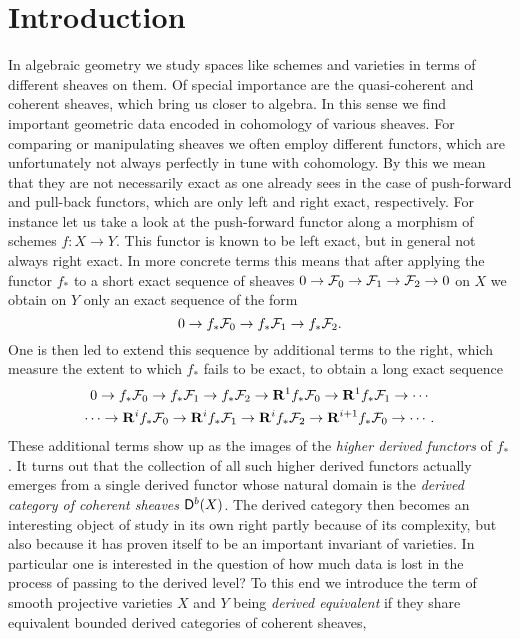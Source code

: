 \section*{Introduction}
{} %

In algebraic geometry we study spaces like schemes and varieties in terms of different sheaves on them. Of special importance are the quasi-coherent and coherent sheaves, which bring us closer to algebra. In this sense we find important geometric data encoded in cohomology of various sheaves. For comparing or manipulating sheaves we often employ different functors, which are unfortunately not always perfectly in tune with cohomology. By this we mean that they are not necessarily exact as one already sees in the case of push-forward and pull-back functors, which are only left and right exact, respectively.
For instance let us take a look at the push-forward functor along a morphism of schemes $f \colon X \to Y$. This functor is known to be left exact, but in general not always right exact. In more concrete terms this means that after applying the functor $f_*$ to a short exact sequence of sheaves $0 \to \mathcal F_0 \to \mathcal F_1 \to \mathcal F_2 \to 0$ on $X$ we obtain on $Y$ only an exact sequence of the form
\[
    0 \to f_*\mathcal F_0 \to f_*\mathcal F_1 \to f_*\mathcal F_2.
\]
One is then led to extend this sequence by additional terms to the right, which measure the extent to which $f_*$ fails to be exact, to obtain a long exact sequence
\begin{multline*}
    0 \to f_*\mathcal F_0 \to f_*\mathcal F_1 \to f_*\mathcal F_2 \to \mathbf{R}^{1}f_*\mathcal F_0 \to \mathbf{R}^{1}f_*\mathcal F_1 \to \cdots \\
    \cdots \to \mathbf{R}^{i}f_*\mathcal F_0 \to \mathbf{R}^{i}f_*\mathcal F_1 \to \mathbf{R}^{i}f_*\mathcal F_2 \to \mathbf{R}^{i+1}f_*\mathcal F_0 \to \cdots.
\end{multline*}
These additional terms show up as the images of the \emph{higher derived functors} of $f_*$. It turns out that the collection of all such higher derived functors actually emerges from a single derived functor whose natural domain is the \emph{derived category of coherent sheaves} $\mathsf{D}^b(X)$. The derived category then becomes an interesting object of study in its own right partly because of its complexity, but also because it has proven itself to be an important invariant of varieties. In particular one is interested in the question of how much data is lost in the process of passing to the derived level? To this end we introduce the term of smooth projective varieties $X$ and $Y$ being \emph{derived equivalent} if they share equivalent bounded derived categories of coherent sheaves, \ie 
